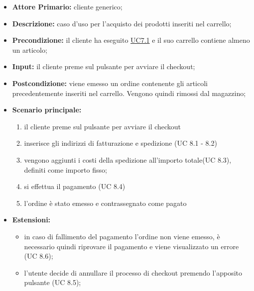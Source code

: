 \begin{itemize}
    \item \textbf{Attore Primario:} cliente generico;
    \item \textbf{Descrizione:} caso d'uso per l'acquisto dei prodotti inseriti nel carrello;
    \item \textbf{Precondizione:} il cliente ha eseguito \hyperref[UC7.1]{UC7.1} e il suo carrello contiene almeno un articolo;
    \item \textbf{Input:} il cliente preme sul pulsante per avviare il checkout;
    \item \textbf{Postcondizione:} viene emesso un ordine contenente gli articoli precedentemente inseriti nel carrello. Vengono quindi rimossi dal magazzino;
    \item \textbf{Scenario principale:}
    \begin{enumerate}
        \item il cliente preme sul pulsante per avviare il checkout
        \item inserisce gli indirizzi di fatturazione e spedizione (UC 8.1 - 8.2)
        \item vengono aggiunti i costi della spedizione all'importo totale(UC 8.3), definiti come importo fisso;
        \item si effettua il pagamento (UC 8.4)
        \item l'ordine è stato emesso e contrassegnato come pagato
    \end{enumerate}
    \item \textbf{Estensioni:}
    \begin{itemize}
        \item in caso di fallimento del pagamento l'ordine non viene emesso, è necessario quindi riprovare il pagamento e viene visualizzato un errore (UC 8.6);
        \item l'utente decide di annullare il processo di checkout premendo l'apposito pulsante (UC 8.5);
    \end{itemize}
\end{itemize}

